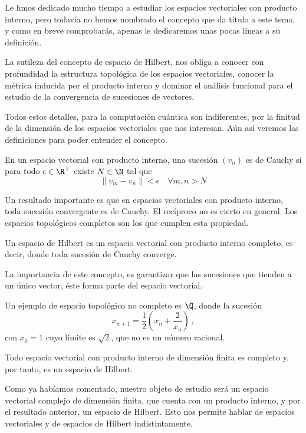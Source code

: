 Le hmos dedicado mucho tiempo a estudiar los espacios vectoriales con producto interno, pero todavía no hemos nombrado el concepto que da título a este tema, y como en breve comprobarás, apenas le dedicaremos unas pocas líneas a su definición.

La sutileza del concepto de espacio de Hilbert, nos obliga a conocer con profundidad la estructura topológica de los espacios vectoriales, conocer la métrica inducida por el producto interno y dominar el análisis funcional para el estudio de la convergencia de sucesiones de vectores.

Todos estos detalles, para la computación cuántica son indiferentes, por la finitud de la dimensión de los espacios vectoriales que nos interesan. Aún así veremos las definiciones para poder entender el concepto.

\begin{defi}
  En un espacio vectorial con producto interno, una sucesión $(v_n)$ es de Cauchy si para todo $\epsilon \in\R^+$ existe $N\in\N$ tal que
  $$\|v_m - v_n\| < \epsilon \quad \forall m, n > N$$
\end{defi}

Un resultado importante es que en espacios vectoriales con producto interno, toda sucesión convergente es de Cauchy. El recíproco no es cierto en general. Los espacios topológicos completos son los que cumplen esta propiedad.

\begin{defi}
  Un espacio de Hilbert es un espacio vectorial con producto interno completo, es decir, donde toda sucesión de Cauchy converge.
\end{defi}

La importancia de este concepto, es garantizar que las sucesiones que tienden a un único vector, éste forma parte del espacio vectorial.

\begin{eje}
  Un ejemplo de espacio topológico no completo es $\Q$, donde la sucesión
  \[
    x_{n+1}=\frac{1}{2}(x_n+\frac{2}{x_n})\,,
  \]
  con $x_0=1$ cuyo límite es $\sqrt{2}$, que no es un número racional.

\end{eje}
\begin{prop}
  Todo espacio vectorial con producto interno de dimensión finita es completo y, por tanto, es un espacio de Hilbert.
\end{prop}

Como ya habíamos comentado, nuestro objeto de estudio será un espacio vectorial complejo de dimensión finita, que cuenta con un producto interno, y por el resultado anterior, un espacio de Hilbert. Esto nos permite hablar de espacios vectoriales y de espacios de Hilbert indistintamente.

